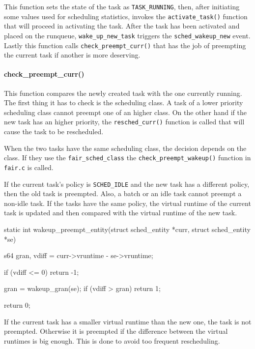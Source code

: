 \documentclass[10pt, oneside]{book}
\begin{document}
This function sets the state of the task as \verb|TASK_RUNNING|, then, after initiating some values used for scheduling statistics, invokes the \verb|activate_task()| function that will proceed in activating the task. After the task has been activated and placed on the runqueue, \verb|wake_up_new_task| triggers the \verb|sched_wakeup_new| \label{trace:sched_wakeup_new} event. Lastly this function calls \verb|check_preempt_curr()| that has the job of preempting the current task if another is more deserving. 

\paragraph{check\_preempt\_curr()}\label{check_preempt_curr}
This function compares the newly created task with the one currently running. The first thing it has to check is the scheduling class. A task of a lower priority scheduling class cannot preempt one of an higher class. On the other hand if the new task has an higher priority, the \verb|resched_curr()| function is called that will cause the task to be rescheduled.

When the two tasks have the same scheduling class, the decision depends on the class. If they use the \verb|fair_sched_class| the \newline \verb|check_preempt_wakeup()| function in \verb|fair.c| is called.

If the current task's policy is \verb|SCHED_IDLE| and the new task has a different policy, then the old task is preempted. Also, a batch or an idle task cannot preempt a non-idle task. If the tasks have the same policy, the virtual runtime of the current task is updated and then compared with the virtual runtime of the new task.

\begin{code}
static int
wakeup_preempt_entity(struct sched_entity *curr, struct sched_entity *se)
{
  s64 gran, vdiff = curr->vruntime - se->vruntime;

  if (vdiff <= 0)
    return -1;

  gran = wakeup_gran(se);
  if (vdiff > gran)
    return 1;

  return 0;
}
\end{code}

If the current task has a smaller virtual runtime than the new one, the task is not preempted. Otherwise it is preempted if the difference between the virtual runtimes is big enough. This is done to avoid too frequent rescheduling. 
\end{document}
